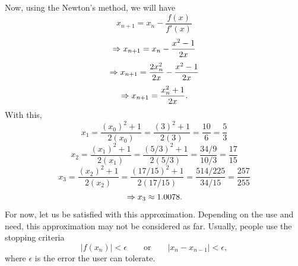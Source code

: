 Now, using the Newton's method, we will have
$$x_{n+1}=x_n - \frac{f(x)}{f'(x)}$$
$$\Rightarrow x_{n+1}=x_n - \frac{x^2-1}{2x}$$
$$\Rightarrow x_{n+1}=\frac{2x_n^2}{2x} - \frac{x^2-1}{2x}$$
$$\Rightarrow x_{n+1}=\frac{x_n^2+1}{2x}.$$
With this,
$$x_1 = \frac{(x_0)^2+1}{2(x_0)} = \frac{(3)^2+1}{2(3)} = \frac{10}{6} = \frac{5}{3}$$
$$x_2 = \frac{(x_1)^2+1}{2(x_1)} = \frac{(5/3)^2+1}{2(5/3)} = \frac{34/9}{10/3} = \frac{17}{15}$$
$$x_3 = \frac{(x_2)^2+1}{2(x_2)} = \frac{(17/15)^2+1}{2(17/15)} = \frac{514/225}{34/15} = \frac{257}{255}$$
$$\Rightarrow x_3 \approx 1.0078.$$
For now, let us be satisfied with this approximation. Depending on the use and need, this approximation may not be considered as far. Usually, people use the stopping criteria
$$\left|f(x_n)\right|<\epsilon\quad\quad\textrm{or}\quad\quad\left| x_{n}-x_{n-1} \right|<\epsilon,$$
where $\epsilon$ is the error the user can tolerate.
\\

